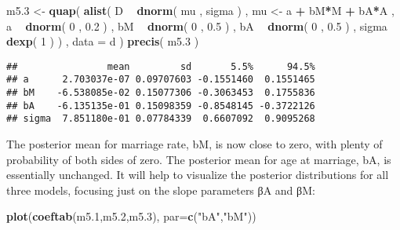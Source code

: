 \documentclass[
]{article}
\newenvironment{Shaded}{\begin{snugshade}}{\end{snugshade}}
\newcommand{\DataTypeTok}[1]{\textcolor[rgb]{0.13,0.29,0.53}{#1}}
\newcommand{\DecValTok}[1]{\textcolor[rgb]{0.00,0.00,0.81}{#1}}
\newcommand{\FloatTok}[1]{\textcolor[rgb]{0.00,0.00,0.81}{#1}}
\newcommand{\KeywordTok}[1]{\textcolor[rgb]{0.13,0.29,0.53}{\textbf{#1}}}
\newcommand{\NormalTok}[1]{#1}
\newcommand{\OperatorTok}[1]{\textcolor[rgb]{0.81,0.36,0.00}{\textbf{#1}}}
\newcommand{\StringTok}[1]{\textcolor[rgb]{0.31,0.60,0.02}{#1}}
\begin{document}
\begin{Shaded}
\begin{Highlighting}[]
\NormalTok{m5}\FloatTok{.3}\NormalTok{ <-}\StringTok{ }\KeywordTok{quap}\NormalTok{(}
    \KeywordTok{alist}\NormalTok{(}
\NormalTok{        D }\OperatorTok{~}\StringTok{ }\KeywordTok{dnorm}\NormalTok{( mu , sigma ) ,}
\NormalTok{        mu <-}\StringTok{ }\NormalTok{a }\OperatorTok{+}\StringTok{ }\NormalTok{bM}\OperatorTok{*}\NormalTok{M }\OperatorTok{+}\StringTok{ }\NormalTok{bA}\OperatorTok{*}\NormalTok{A ,}
\NormalTok{        a }\OperatorTok{~}\StringTok{ }\KeywordTok{dnorm}\NormalTok{( }\DecValTok{0}\NormalTok{ , }\FloatTok{0.2}\NormalTok{ ) ,}
\NormalTok{        bM }\OperatorTok{~}\StringTok{ }\KeywordTok{dnorm}\NormalTok{( }\DecValTok{0}\NormalTok{ , }\FloatTok{0.5}\NormalTok{ ) ,}
\NormalTok{        bA }\OperatorTok{~}\StringTok{ }\KeywordTok{dnorm}\NormalTok{( }\DecValTok{0}\NormalTok{ , }\FloatTok{0.5}\NormalTok{ ) ,}
\NormalTok{        sigma }\OperatorTok{~}\StringTok{ }\KeywordTok{dexp}\NormalTok{( }\DecValTok{1}\NormalTok{ )}
\NormalTok{    ) , }\DataTypeTok{data =}\NormalTok{ d )}
\KeywordTok{precis}\NormalTok{( m5}\FloatTok{.3}\NormalTok{ )}
\end{Highlighting}
\end{Shaded}

\begin{verbatim}
##                mean         sd       5.5%      94.5%
## a      2.703037e-07 0.09707603 -0.1551460  0.1551465
## bM    -6.538085e-02 0.15077306 -0.3063453  0.1755836
## bA    -6.135135e-01 0.15098359 -0.8548145 -0.3722126
## sigma  7.851180e-01 0.07784339  0.6607092  0.9095268
\end{verbatim}

The posterior mean for marriage rate, bM, is now close to zero, with
plenty of probability of both sides of zero. The posterior mean for age
at marriage, bA, is essentially unchanged. It will help to visualize the
posterior distributions for all three models, focusing just on the slope
parameters βA and βM:

\begin{Shaded}
\begin{Highlighting}[]
\KeywordTok{plot}\NormalTok{(}\KeywordTok{coeftab}\NormalTok{(m5}\FloatTok{.1}\NormalTok{,m5}\FloatTok{.2}\NormalTok{,m5}\FloatTok{.3}\NormalTok{), }\DataTypeTok{par=}\KeywordTok{c}\NormalTok{(}\StringTok{"bA"}\NormalTok{,}\StringTok{"bM"}\NormalTok{))}
\end{Highlighting}
\end{Shaded}
\end{document}
